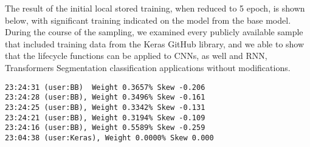 The result of the initial local stored training, when reduced to 5 epoch, is shown below, with significant training indicated on the model from the base model.
During the course of the sampling, we examined every publicly available sample that included training data from the Keras GitHub library, and we able to show that the lifecycle functions can be applied to CNNs, as well and RNN, Transformers Segmentation classification applications without modifications. 

\begin{lstlisting}
23:24:31 (user:BB)  Weight 0.3657% Skew -0.206
23:24:28 (user:BB), Weight 0.3496% Skew -0.161
23:24:25 (user:BB), Weight 0.3342% Skew -0.131
23:24:21 (user:BB), Weight 0.3194% Skew -0.109
23:24:16 (user:BB), Weight 0.5589% Skew -0.259
23:04:38 (user:Keras), Weight 0.0000% Skew 0.000
\end{lstlisting}

